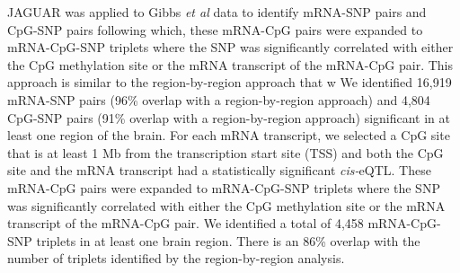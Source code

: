 \documentclass[hidelinks]{article}
\begin{document}
%
JAGUAR was applied to Gibbs \emph{et al} data to identify mRNA-SNP pairs and CpG-SNP pairs following which, these mRNA-CpG pairs were expanded to mRNA-CpG-SNP triplets where the SNP was significantly correlated with either the CpG methylation site or the mRNA transcript of the mRNA-CpG pair. This approach is similar to the region-by-region approach that w We identified 16,919 mRNA-SNP pairs (96\% overlap with a region-by-region approach) and 4,804 CpG-SNP pairs (91\% overlap with a region-by-region approach) significant in at least one region of the brain. For each mRNA transcript, we selected a CpG site that is at least 1 Mb from the transcription start site (TSS) and both the CpG site and the mRNA transcript had a statistically significant \emph{cis-}eQTL. These mRNA-CpG pairs were expanded to mRNA-CpG-SNP triplets where the SNP was significantly correlated with either the CpG methylation site or the mRNA transcript of the mRNA-CpG pair. We identified a total of 4,458 mRNA-CpG-SNP triplets in at least one brain region. There is an 86\% overlap with the number of triplets identified by the region-by-region analysis.

%
%
%
%
\end{document}
